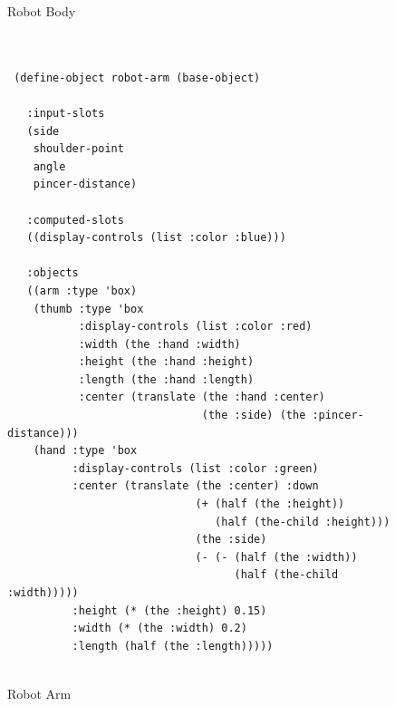 \documentclass [11pt]{book}
\begin{document}
\begin{figure}
\begin{lrbox}{\boxedverb}
\begin{minipage}{\linewidth}
{\begin{verbatim}
\end{verbatim}}
\end{minipage}
\end{lrbox}
\fbox{\usebox{\boxedverb}}

\caption{Robot Body}

\label{code:robot-body}

\end{figure}

\begin{figure}
\begin{lrbox}{\boxedverb}
\begin{minipage}{\linewidth}

\begin{verbatim}


 (define-object robot-arm (base-object)

   :input-slots
   (side
    shoulder-point
    angle
    pincer-distance)

   :computed-slots
   ((display-controls (list :color :blue)))

   :objects
   ((arm :type 'box)
    (thumb :type 'box
           :display-controls (list :color :red)
           :width (the :hand :width)
           :height (the :hand :height)
           :length (the :hand :length)
           :center (translate (the :hand :center) 
                              (the :side) (the :pincer-distance)))
    (hand :type 'box
          :display-controls (list :color :green)
          :center (translate (the :center) :down
                             (+ (half (the :height)) 
                                (half (the-child :height)))
                             (the :side)
                             (- (- (half (the :width)) 
                                   (half (the-child :width)))))
          :height (* (the :height) 0.15)
          :width (* (the :width) 0.2)
          :length (half (the :length)))))      
      
\end{verbatim}
\end{minipage}
\end{lrbox}
\fbox{\usebox{\boxedverb}}

\caption{Robot Arm}

\label{code:robot-arm}

\end{figure}
\end{document}
